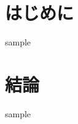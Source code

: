 \documentclass[a4j, 11pt, twocolumn, uplatex]{jsarticle}
\begin{document}

    \section{はじめに}
    sample

    \section{結論}
    sample
\end{document}

